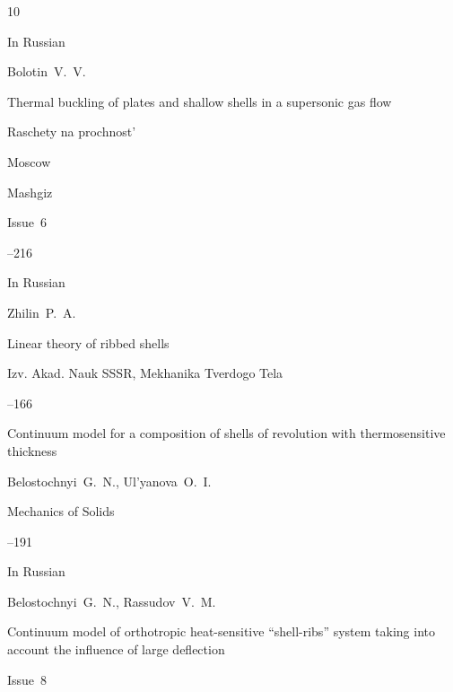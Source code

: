 \begin{thebibliography}{10}

\lang In Russian

\by Bolotin~V.~V.

\paper Thermal buckling of plates and shallow shells in a supersonic gas flow

\inbook Raschety na prochnost'

\publaddr Moscow

\publ Mashgiz


\volinfo Issue~6

--216




\lang In Russian

\by Zhilin~P.~A.

\paper Linear theory of ribbed shells

\jour Izv. Akad. Nauk SSSR, Mekhanika Tverdogo Tela



--166



 




\paper Continuum model for a composition of shells of revolution with thermosensitive thickness

\by Belostochnyi~G.~N., Ul'yanova~O.~I.

\jour Mechanics of Solids




--191





 


\lang In Russian

\by Belostochnyi~G.~N., Rassudov~V.~M.

\paper Continuum model of orthotropic heat-sensitive ``shell-ribs'' system taking into account the influence of large deflection


\volinfo Issue~8


\end{thebibliography}
